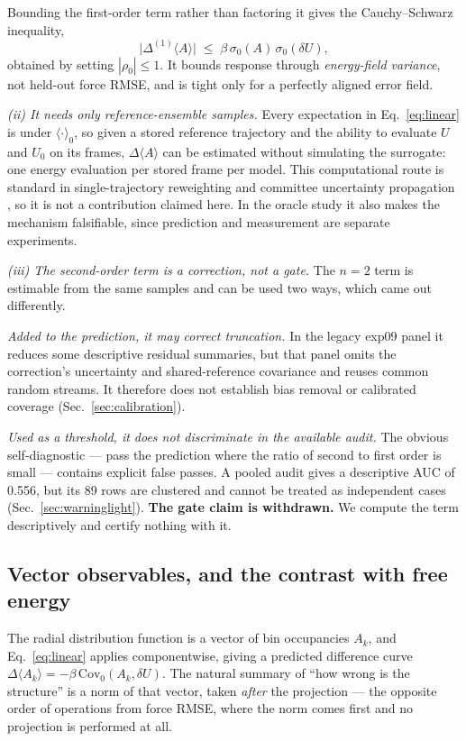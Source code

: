 \documentclass[aip,jcp,reprint,amsmath,amssymb,floatfix]{revtex4-2}
\newcommand{\dU}{\ensuremath{\delta U}}
\newcommand{\avg}[1]{\ensuremath{\langle #1 \rangle}}
\newcommand{\avgz}[1]{\ensuremath{\langle #1 \rangle_{0}}}
\newcommand{\Cov}{\ensuremath{\mathrm{Cov}}}
\begin{document}
Bounding the first-order term rather than factoring it gives the
Cauchy--Schwarz inequality,
\begin{equation}
\big|\Delta^{(1)}\avg{A}\big| \;\le\;
\beta\,\sigma_0(A)\,\sigma_0(\dU),
\label{eq:cs2}
\end{equation}
obtained by setting $|\rho_0| \le 1$. It bounds response through
\emph{energy-field variance}, not held-out force RMSE, and is tight only for a
perfectly aligned error field.

\emph{(ii) It needs only reference-ensemble samples.} Every expectation in
Eq.~\eqref{eq:linear} is under $\avgz{\cdot}$, so given a stored reference
trajectory and the ability to evaluate $U$ and $U_0$ on its frames,
$\Delta\avg{A}$ can be estimated without simulating the surrogate: one energy
evaluation per stored frame per model. This computational route is standard in
single-trajectory reweighting and committee uncertainty propagation
\cite{Imbalzano2021}, so it is not a contribution claimed here. In the oracle
study it also makes the mechanism
falsifiable, since prediction and measurement are separate experiments.

\emph{(iii) The second-order term is a correction, not a gate.} The $n = 2$
term is estimable from the same samples and can be used two ways, which came out
differently.

\emph{Added to the prediction, it may correct truncation.} In the legacy exp09
panel it reduces some descriptive residual summaries, but that panel omits the
correction's uncertainty and shared-reference covariance and reuses common
random streams. It therefore does not establish bias removal or calibrated
coverage (Sec.~\ref{sec:calibration}).

\emph{Used as a threshold, it does not discriminate in the available audit.}
The obvious self-diagnostic --- pass the prediction where the ratio of second to
first order is small --- contains explicit false passes. A pooled audit gives a
descriptive AUC of 0.556, but its 89 rows are clustered and cannot be treated as
independent cases (Sec.~\ref{sec:warninglight}). \textbf{The gate claim is
withdrawn.} We compute the term descriptively and certify nothing with it.

\subsection{Vector observables, and the contrast with free energy}

The radial distribution function is a vector of bin
occupancies $A_k$, and Eq.~\eqref{eq:linear} applies componentwise, giving a
predicted difference curve $\Delta\avg{A_k} = -\beta\,\Cov_0(A_k, \dU)$. The
natural summary of ``how wrong is the structure'' is a norm of that vector,
taken \emph{after} the projection --- the opposite
order of operations from force RMSE, where the norm comes first and no
projection is performed at all.
\end{document}
